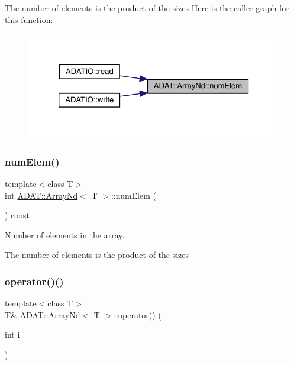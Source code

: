 The number of elements is the product of the sizes Here is the caller graph for this function\+:
\nopagebreak
\begin{figure}[H]
\begin{center}
\leavevmode
\includegraphics[width=326pt]{d1/db2/classADAT_1_1ArrayNd_a5c33ae0e66b53a2fd86f804f0f4292e9_icgraph}
\end{center}
\end{figure}
\mbox{\label{classADAT_1_1ArrayNd_a5c33ae0e66b53a2fd86f804f0f4292e9}} 
\subsubsection{\texorpdfstring{numElem()}{numElem()}\hspace{0.1cm}{\footnotesize\ttfamily [3/3]}}
{\footnotesize\ttfamily template$<$class T$>$ \\
int \mbox{\hyperlink{classADAT_1_1ArrayNd}{A\+D\+A\+T\+::\+Array\+Nd}}$<$ T $>$\+::num\+Elem (\begin{DoxyParamCaption}{ }\end{DoxyParamCaption}) const\hspace{0.3cm}{\ttfamily [inline]}}



Number of elements in the array. 

The number of elements is the product of the sizes \mbox{\label{classADAT_1_1ArrayNd_a927bb95e9323c4f74e0721ee867bcb64}} 
\subsubsection{\texorpdfstring{operator()()}{operator()()}\hspace{0.1cm}{\footnotesize\ttfamily [1/24]}}
{\footnotesize\ttfamily template$<$class T$>$ \\
T\& \mbox{\hyperlink{classADAT_1_1ArrayNd}{A\+D\+A\+T\+::\+Array\+Nd}}$<$ T $>$\+::operator() (\begin{DoxyParamCaption}\item[{int}]{i }\end{DoxyParamCaption})\hspace{0.3cm}{\ttfamily [inline]}}




